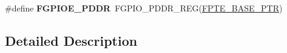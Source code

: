 \begin{DoxyCompactItemize}
\item 
\hypertarget{group___f_g_p_i_o___register___accessor___macros_ga808099029ad996db9abe97d36a1c7b9d}{}\#define {\bfseries F\+G\+P\+I\+O\+E\+\_\+\+P\+D\+D\+R}~F\+G\+P\+I\+O\+\_\+\+P\+D\+D\+R\+\_\+\+R\+E\+G(\hyperlink{group___f_g_p_i_o___peripheral_ga191ce600c147c06111ecea5b3b0aa6fb}{F\+P\+T\+E\+\_\+\+B\+A\+S\+E\+\_\+\+P\+T\+R})\label{group___f_g_p_i_o___register___accessor___macros_ga808099029ad996db9abe97d36a1c7b9d}

\end{DoxyCompactItemize}


\subsection{Detailed Description}
